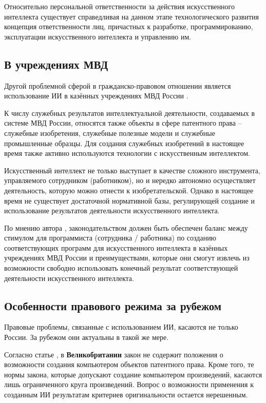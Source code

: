 Относительно персональной ответственности за действия искусственного интеллекта существует справедливая
на данном этапе технологического развития концепция ответственности лиц, причастных к разработке,
программированию, эксплуатации искусственного интеллекта и управлению им.

\subsection{В учреждениях МВД}
Другой проблемной сферой в гражданско-правовом отношении является использование ИИ в казённых
учреждениях МВД России \cite{civil}.

К числу служебных результатов интеллектуальной деятельности, создаваемых в системе МВД России,
относятся также объекты в сфере патентного права – служебные изобретения, служебные полезные модели
и служебные промышленные образцы. Для создания служебных изобретений в настоящее время также активно
используются технологии с искусственным интеллектом.

Искусственный интеллект не только выступает в
качестве сложного инструмента, управляемого сотрудником (работником), но и нередко автономно
осуществляет деятельность, которую можно отнести к изобретательской. Однако в настоящее время
не существует достаточной нормативной базы, регулирующей создание и использование
результатов деятельности искусственного интеллекта.

По мнению автора \cite{civil},
законодательством должен быть обеспечен баланс между стимулом для программиста (сотрудника / работника)
по созданию соответствующих программ для искусственного интеллекта в казённых учреждениях МВД России
и преимуществами, которые они смогут извлечь из возможности свободно
использовать конечный результат соответствующей деятельности искусственного интеллекта.

\subsection{Особенности правового режима за рубежом}
Правовые проблемы, связанные с использованием ИИ, касаются не только России. За рубежом они
актуальны в такой же мере.

Согласно статье \cite{abr}, в \textbf{Великобритании} закон не содержит  положения о возможности создания
компьютером объектов патентного права. Кроме того, те нормы закона, которые допускают создание компьютером
произведений, касаются лишь ограниченного круга произведений. Вопрос о возможности применения к созданным
ИИ результатам критериев оригинальности остается нерешенным.

